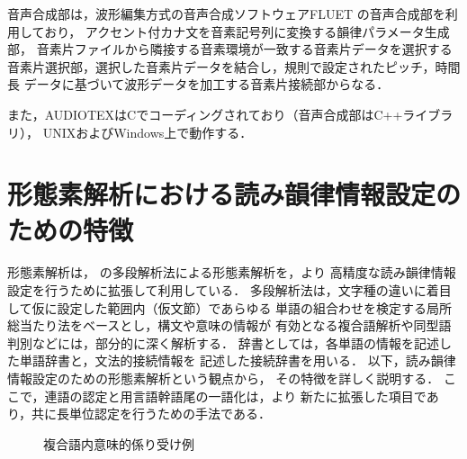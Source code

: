 音声合成部は，波形編集方式の音声合成ソフトウェアFLUET
\cite{Hakoda2}の音声合成部を利用しており，
アクセント付カナ文を音素記号列に変換する韻律パラメータ生成部，
音素片ファイルから隣接する音素環境が一致する音素片データを選択する
音素片選択部，選択した音素片データを結合し，規則で設定されたピッチ，時間長
データに基づいて波形データを加工する音素片接続部からなる．

また，AUDIOTEXはCでコーディングされており（音声合成部はC++ライブラリ），
UNIXおよびWindows上で動作する．

\section{形態素解析における読み韻律情報設定のための特徴}\label{sec:morph}
形態素解析は，
\cite{Miyazaki1}の多段解析法による形態素解析を，より
高精度な読み韻律情報設定を行うために拡張して利用している．
多段解析法は，文字種の違いに着目して仮に設定した範囲内（仮文節）であらゆる
単語の組合わせを検定する局所総当たり法をベースとし，構文や意味の情報が
有効となる複合語解析や同型語判別などには，部分的に深く解析する．
辞書としては，各単語の情報を記述した単語辞書と，文法的接続情報を
記述した接続辞書を用いる．
以下，読み韻律情報設定のための形態素解析という観点から，
その特徴を詳しく説明する．
ここで，連語の認定と用言語幹語尾の一語化は，\cite{Miyazaki1}より
新たに拡張した項目であり，共に長単位認定を行うための手法である．

\begin{figure}[tb]
\begin{center}
\end{center}
\caption{複合語内意味的係り受け例}
\label{fig:kakari}
\end{figure}

